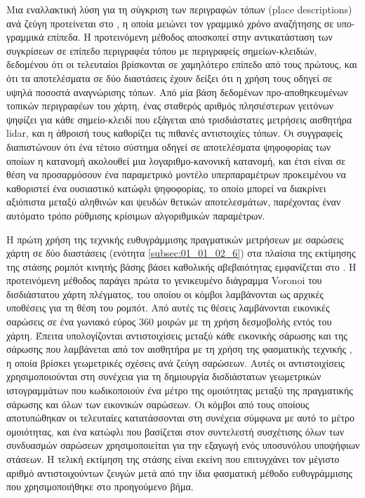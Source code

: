 Μια εναλλακτική λύση για τη σύγκριση των περιγραφών τόπων (place descriptions)
ανά ζεύγη προτείνεται στο \cite{Bosse2013}, η οποία μειώνει τον γραμμικό χρόνο
αναζήτησης σε υπο-γραμμικά επίπεδα. Η προτεινόμενη μέθοδος αποσκοπεί στην
αντικατάσταση των συγκρίσεων σε επίπεδο περιγραφέα τόπου με περιγραφείς
σημείων-κλειδιών, δεδομένου ότι οι τελευταίοι βρίσκονται σε χαμηλότερο επίπεδο
από τους πρώτους, και ότι τα αποτελέσματα σε δύο διαστάσεις έχουν δείξει ότι η
χρήση τους οδηγεί σε υψηλά ποσοστά αναγνώρισης τόπων. Από μία βάση δεδομένων
προ-αποθηκευμένων τοπικών περιγραφέων του χάρτη, ένας σταθερός αριθμός
πλησιέστερων γειτόνων ψηφίζει για κάθε σημείο-κλειδί που εξάγεται από
τρισδιάστατες μετρήσεις αισθητήρα lidar, και η άθροισή τους καθορίζει τις
πιθανές αντιστοιχίες τόπων. Οι συγγραφείς διαπιστώνουν ότι ένα τέτοιο σύστημα
οδηγεί σε αποτελέσματα ψηφοφορίας των οποίων η κατανομή ακολουθεί μια
λογαριθμο-κανονική κατανομή, και έτσι είναι σε θέση να προσαρμόσουν ένα
παραμετρικό μοντέλο υπερπαραμέτρων προκειμένου να καθοριστεί ένα ουσιαστικό
κατώφλι ψηφοφορίας, το οποίο μπορεί να διακρίνει αξιόπιστα μεταξύ αληθινών και
ψευδών θετικών αποτελεσμάτων, παρέχοντας έναν αυτόματο τρόπο ρύθμισης κρίσιμων
αλγοριθμικών παραμέτρων.

Η πρώτη χρήση της τεχνικής ευθυγράμμισης πραγματικών μετρήσεων με σαρώσεις
χάρτη σε δύο διαστάσεις (ενότητα \ref{subsec:01_01_02_6}) στα πλαίσια της
εκτίμησης της στάσης ρομπότ κινητής βάσης βάσει καθολικής αβεβαιότητας
εμφανίζεται στο \cite{Park2014a}. Η προτεινόμενη μέθοδος παράγει πρώτα το
γενικευμένο διάγραμμα Voronoi του δισδιάστατου χάρτη πλέγματος, του οποίου οι
κόμβοι λαμβάνονται ως αρχικές υποθέσεις για τη θέση του ρομπότ. Από αυτές τις
θέσεις λαμβάνονται εικονικές σαρώσεις σε ένα γωνιακό εύρος $360$ μοιρών με τη
χρήση δεσμοβολής εντός του χάρτη. Έπειτα υπολογίζονται αντιστοιχίσεις μεταξύ
κάθε εικονικής σάρωσης και της σάρωσης που λαμβάνεται από τον αισθητήρα με τη
χρήση της φασματικής τεχνικής \cite{Leordeanu2005a}, η οποία βρίσκει
γεωμετρικές σχέσεις ανά ζεύγη σαρώσεων. Αυτές οι αντιστοιχίσεις
χρησιμοποιούνται στη συνέχεια για τη δημιουργία δισδιάστατων γεωμετρικών
ιστογραμμάτων που κωδικοποιούν ένα μέτρο της ομοιότητας μεταξύ της πραγματικής
σάρωσης και όλων των εικονικών σαρώσεων.  Οι κόμβοι από τους οποίους
αποτυπώθηκαν οι τελευταίες κατατάσσονται στη συνέχεια σύμφωνα με αυτό το μέτρο
ομοιότητας, και ένα κατώφλι που βασίζεται στον συντελεστή συσχέτισης όλων των
συνδυασμών σαρώσεων χρησιμοποιείται για την εξαγωγή ενός υποσυνόλου υποψήφιων
στάσεων. Η τελική εκτίμηση της στάσης είναι εκείνη που επιτυγχάνει τον μέγιστο
αριθμό αντιστοιχούντων ζευγών μετά από την ίδια φασματική μέθοδο ευθυγράμμισης
που χρησιμοποιήθηκε στο προηγούμενο βήμα.

